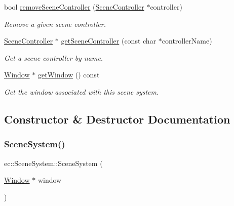 \begin{DoxyCompactItemize}
bool \mbox{\hyperlink{classec_1_1_scene_system_ad15260128496d698ad43c2632e2dc7b4}{remove\+Scene\+Controller}} (\mbox{\hyperlink{classec_1_1_scene_controller}{Scene\+Controller}} $\ast$controller)
\begin{DoxyCompactList}\small\item\em Remove a given scene controller. \end{DoxyCompactList}\item 
\mbox{\hyperlink{classec_1_1_scene_controller}{Scene\+Controller}} $\ast$ \mbox{\hyperlink{classec_1_1_scene_system_a0f897d342ba9a7ed8a06a478e6834c6c}{get\+Scene\+Controller}} (const char $\ast$controller\+Name)
\begin{DoxyCompactList}\small\item\em Get a scene controller by name. \end{DoxyCompactList}\item 
\mbox{\hyperlink{classec_1_1_window}{Window}} $\ast$ \mbox{\hyperlink{classec_1_1_scene_system_afc687c570e4c1b83a85bf2bd69fa86eb}{get\+Window}} () const
\begin{DoxyCompactList}\small\item\em Get the window associated with this scene system. \end{DoxyCompactList}\end{DoxyCompactItemize}


\subsection{Constructor \& Destructor Documentation}
\mbox{\label{classec_1_1_scene_system_aa5a44baf7e80b2d7d0d96a84847bf2b6}} 
\subsubsection{\texorpdfstring{Scene\+System()}{SceneSystem()}}
{\footnotesize\ttfamily ec\+::\+Scene\+System\+::\+Scene\+System (\begin{DoxyParamCaption}\item[{\mbox{\hyperlink{classec_1_1_window}{Window}} $\ast$}]{window }\end{DoxyParamCaption})\hspace{0.3cm}{\ttfamily [explicit]}}

\mbox{\label{classec_1_1_scene_system_a612e6cc45dbea62c7ffa4c752f965482}} 

